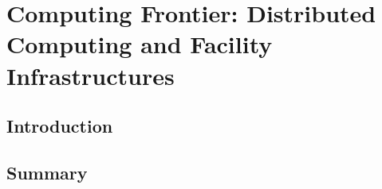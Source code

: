 
\chapter{Computing Frontier: Distributed Computing and Facility Infrastructures}
\label{chap:mag}


\begin{center}\begin{boldmath}



\end{boldmath}\end{center}


\section{Introduction}
\label{sec:comp-intro}





\section{Summary}
\label{sec:comp-summary}




